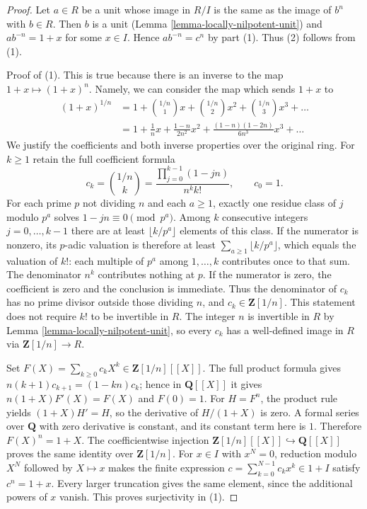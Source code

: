 \begin{proof}
Let $a \in R$ be a unit whose image in $R/I$ is the same as the image
of $b^n$ with $b \in R$. Then $b$ is a unit
(Lemma \ref{lemma-locally-nilpotent-unit}) and
$ab^{-n} = 1 + x$ for some $x \in I$. Hence $ab^{-n} = c^n$ by
part (1). Thus (2) follows from (1).

\medskip\noindent
Proof of (1). This is true because there is an inverse to the
map $1 + x \mapsto (1 + x)^n$. Namely, we can consider the map
which sends $1 + x$ to
\begin{align*}
(1 + x)^{1/n}
& =
1 + {1/n \choose 1}x +
{1/n \choose 2}x^2 +
{1/n \choose 3}x^3 + \ldots \\
& =
1 + \frac{1}{n} x + \frac{1 - n}{2n^2}x^2 +
\frac{(1 - n)(1 - 2n)}{6n^3}x^3 + \ldots
\end{align*}
We justify the coefficients and both inverse properties over the original ring.
For $k\geq1$ retain the full coefficient formula
$$
c_k={1/n\choose k}
=\frac{\prod_{j=0}^{k-1}(1-jn)}{n^k k!},\qquad c_0=1.
$$
For each prime $p$ not dividing $n$ and each $a\geq1$, exactly one
residue class of $j$ modulo $p^a$ solves $1-jn\equiv0\pmod{p^a}$.
Among $k$ consecutive integers $j=0,\ldots,k-1$ there are at least
$\lfloor k/p^a\rfloor$ elements of this class. If the numerator is
nonzero, its $p$-adic valuation is therefore at least
$\sum_{a\geq1}\lfloor k/p^a\rfloor$, which equals the valuation
of $k!$: each multiple of $p^a$ among $1,\ldots,k$ contributes once
to that sum. The denominator $n^k$ contributes nothing at $p$.
If the numerator is zero, the coefficient is zero and the conclusion
is immediate. Thus the denominator of $c_k$ has no prime divisor
outside those dividing $n$, and $c_k\in\mathbf Z[1/n]$.
This statement does not require $k!$ to be invertible in $R$.
The integer $n$ is invertible in $R$ by
Lemma \ref{lemma-locally-nilpotent-unit}, so every $c_k$ has a
well-defined image in $R$ via $\mathbf Z[1/n]\to R$.

\medskip\noindent
Set $F(X)=\sum_{k\geq0}c_kX^k\in\mathbf Z[1/n][[X]]$.
The full product formula gives
$n(k+1)c_{k+1}=(1-kn)c_k$; hence in $\mathbf Q[[X]]$ it gives
$n(1+X)F'(X)=F(X)$ and $F(0)=1$.
For $H=F^n$, the product rule yields $(1+X)H'=H$, so the derivative
of $H/(1+X)$ is zero. A formal series over $\mathbf Q$ with zero
derivative is constant, and its constant term here is $1$.
Therefore $F(X)^n=1+X$. The coefficientwise injection
$\mathbf Z[1/n][[X]]\hookrightarrow\mathbf Q[[X]]$ proves the same
identity over $\mathbf Z[1/n]$.
For $x\in I$ with $x^N=0$, reduction modulo $X^N$ followed by
$X\mapsto x$ makes the finite expression
$c=\sum_{k=0}^{N-1}c_kx^k\in1+I$ satisfy $c^n=1+x$.
Every larger truncation gives the same element, since the additional
powers of $x$ vanish. This proves surjectivity in (1).


\end{proof}
